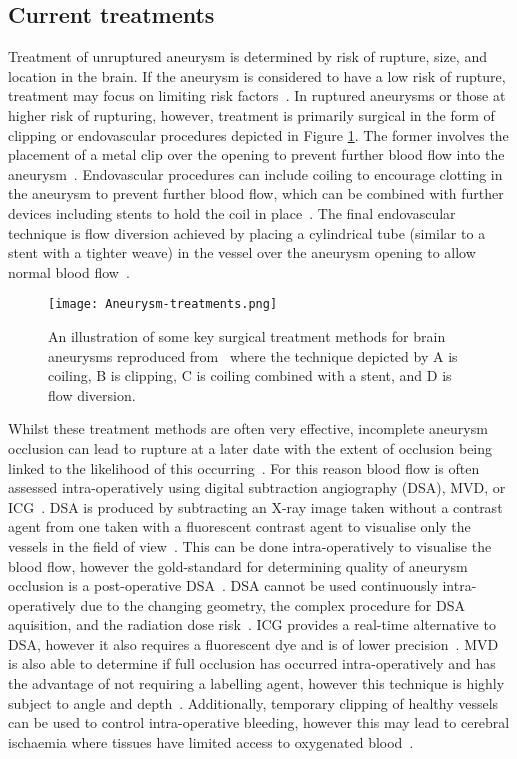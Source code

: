\subsection{Current treatments}\label{sec:introaneurysmtreatments}
Treatment of unruptured aneurysm is determined by risk of rupture, size, and location in the brain. If the aneurysm is considered to have a low risk of rupture, treatment may focus on limiting risk factors~\citep{NationalHealthService2022}. In ruptured aneurysms or those at higher risk of rupturing, however, treatment is primarily surgical in the form of clipping or endovascular procedures depicted in Figure \ref{fig:aneurysmtreatment}. The former involves the placement of a metal clip over the opening to prevent further blood flow into the aneurysm~\citep{TheBrainFoundation2023}. Endovascular procedures can include coiling to encourage clotting in the aneurysm to prevent further blood flow, which can be combined with further devices including stents to hold the coil in place~\citep{TheBrainFoundation2023}. The final endovascular technique is flow diversion achieved by placing a cylindrical tube (similar to a stent with a tighter weave) in the vessel over the aneurysm opening to allow normal blood flow~\citep{TheBrainFoundation2023}. 
\begin{figure}[h]
    \centering
    \texttt{[image: Aneurysm-treatments.png]}
    \caption{An illustration of some key surgical treatment methods for brain aneurysms reproduced from~\citet{TheBrainFoundation2023} where the technique depicted by A is coiling, B is clipping, C is coiling combined with a stent, and D is flow diversion.}
    \label{fig:aneurysmtreatment}
\end{figure}
Whilst these treatment methods are often very effective, incomplete aneurysm occlusion can lead to rupture at a later date with the extent of occlusion being linked to the likelihood of this occurring~\citep{Toth2018}. For this reason blood flow is often assessed intra-operatively using digital subtraction angiography (DSA), MVD, or ICG~\citep{Norat2019}. DSA is produced by subtracting an X-ray image taken without a contrast agent from one taken with a fluorescent contrast agent to visualise only the vessels in the field of view~\citep{Radiopia2022}. This can be done intra-operatively to visualise the blood flow, however the gold-standard for determining quality of aneurysm occlusion is a post-operative DSA~\citep{Marbacher2020}. DSA cannot be used continuously intra-operatively due to the changing geometry, the complex procedure for DSA aquisition, and the radiation dose risk~\citep{Radiopia2022, Derdeyn1999}. ICG provides a real-time alternative to DSA, however it also requires a fluorescent dye and is of lower precision~\citep{Norat2019, Anania2023}. MVD is also able to determine if full occlusion has occurred intra-operatively and has the advantage of not requiring a labelling agent, however this technique is highly subject to angle and depth~\citep{Anania2023}. Additionally, temporary clipping of healthy vessels can be used to control intra-operative bleeding, however this may lead to cerebral ischaemia where tissues have limited access to oxygenated blood~\citep{Doron2022}. 

